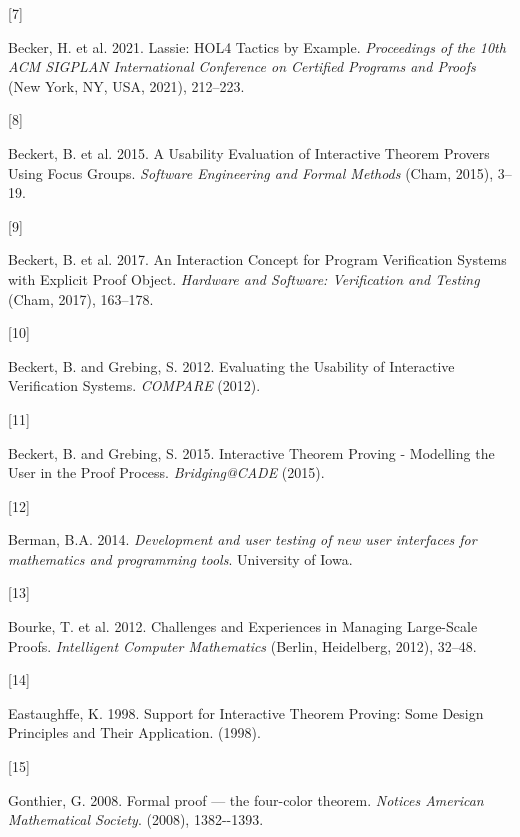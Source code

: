 \documentclass[
]{article}
\newlength{\cslhangindent}
\newlength{\csllabelwidth}
\newlength{\cslentryspacingunit} %
\newenvironment{CSLReferences}[2] %
 {%
  \setlength{\parindent}{0pt}
  \ifodd #1
  \let\oldpar\par
  \def\par{\hangindent=\cslhangindent\oldpar}
  \fi
  \setlength{\parskip}{#2\cslentryspacingunit}
 }%
 {}
\newcommand{\CSLLeftMargin}[1]{\parbox[t]{\csllabelwidth}{#1}}
\newcommand{\CSLRightInline}[1]{\parbox[t]{\linewidth - \csllabelwidth}{#1}\break}
\begin{document}
\begin{CSLReferences}{0}{0}
\leavevmode{}%
\CSLLeftMargin{{[}7{]} }
\CSLRightInline{Becker, H. et al. 2021. Lassie: {HOL4} {Tactics} by
{Example}. \emph{Proceedings of the 10th {ACM} {SIGPLAN} {International}
{Conference} on {Certified} {Programs} and {Proofs}} (New York, NY, USA,
2021), 212--223.}

\leavevmode{}%
\CSLLeftMargin{{[}8{]} }
\CSLRightInline{Beckert, B. et al. 2015. A {Usability} {Evaluation} of
{Interactive} {Theorem} {Provers} {Using} {Focus} {Groups}.
\emph{Software {Engineering} and {Formal} {Methods}} (Cham, 2015),
3--19.}

\leavevmode{}%
\CSLLeftMargin{{[}9{]} }
\CSLRightInline{Beckert, B. et al. 2017. An {Interaction} {Concept} for
{Program} {Verification} {Systems} with {Explicit} {Proof} {Object}.
\emph{Hardware and {Software}: {Verification} and {Testing}} (Cham,
2017), 163--178.}

\leavevmode{}%
\CSLLeftMargin{{[}10{]} }
\CSLRightInline{Beckert, B. and Grebing, S. 2012. Evaluating the
{Usability} of {Interactive} {Verification} {Systems}. \emph{{COMPARE}}
(2012).}

\leavevmode{}%
\CSLLeftMargin{{[}11{]} }
\CSLRightInline{Beckert, B. and Grebing, S. 2015. Interactive {Theorem}
{Proving} - {Modelling} the {User} in the {Proof} {Process}.
\emph{Bridging@{CADE}} (2015).}

\leavevmode{}%
\CSLLeftMargin{{[}12{]} }
\CSLRightInline{Berman, B.A. 2014. \emph{Development and user testing of
new user interfaces for mathematics and programming tools}. University
of Iowa.}

\leavevmode{}%
\CSLLeftMargin{{[}13{]} }
\CSLRightInline{Bourke, T. et al. 2012. Challenges and {Experiences} in
{Managing} {Large}-{Scale} {Proofs}. \emph{Intelligent {Computer}
{Mathematics}} (Berlin, Heidelberg, 2012), 32--48.}

\leavevmode{}%
\CSLLeftMargin{{[}14{]} }
\CSLRightInline{Eastaughffe, K. 1998. Support for {Interactive}
{Theorem} {Proving}: {Some} {Design} {Principles} and {Their}
{Application}. (1998).}

\leavevmode{}%
\CSLLeftMargin{{[}15{]} }
\CSLRightInline{Gonthier, G. 2008. Formal proof --- the four-color
theorem. \emph{Notices American Mathematical Society}. (2008),
1382-\/-1393.}


\end{CSLReferences}
\end{document}
